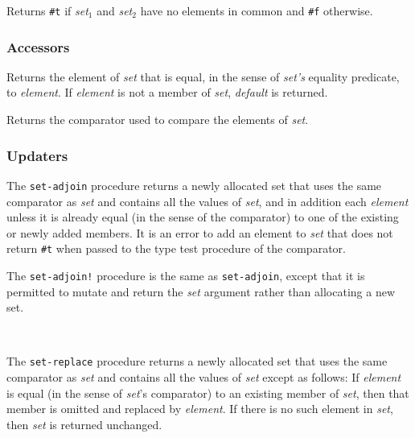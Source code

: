 \begin{entry}{%
  }

  Returns \texttt{\#t} if \emph{set$_1$} and
  \emph{set$_2$} have no elements in common and
  \texttt{\#f} otherwise.
\end{entry}

\subsubsection{Accessors}

\begin{entry}{%
  }

  Returns the element of \emph{set} that is equal, in the sense of
  \emph{set's} equality predicate, to \emph{element}. If
  \emph{element} is not a member of \emph{set}, \emph{default} is
  returned.
\end{entry}

\begin{entry}{%
  }

  Returns the comparator used to compare the elements of \emph{set}.
\end{entry}

\subsubsection{Updaters}

\begin{entry}{%
  }

  The \texttt{set-adjoin} procedure returns a newly allocated set that
  uses the same comparator as \emph{set} and contains all the values
  of \emph{set}, and in addition each \emph{element} unless it is
  already equal (in the sense of the comparator) to one of the
  existing or newly added members. It is an error to add an element to
  \emph{set} that does not return \texttt{\#t} when passed to the type
  test procedure of the comparator.
\end{entry}

\begin{entry}{%
  }

  The \texttt{set-adjoin!} procedure is the same as
  \texttt{set-adjoin}, except that it is permitted to mutate and
  return the \emph{set} argument rather than allocating a new set.
\end{entry}
\
\begin{entry}{%
  }

  The \texttt{set-replace} procedure returns a newly allocated set
  that uses the same comparator as \emph{set} and contains all the
  values of \emph{set} except as follows: If \emph{element} is equal
  (in the sense of \emph{set}'s comparator) to an existing member of
  \emph{set}, then that member is omitted and replaced by
  \emph{element}. If there is no such element in \emph{set}, then
  \emph{set} is returned unchanged.
\end{entry}

